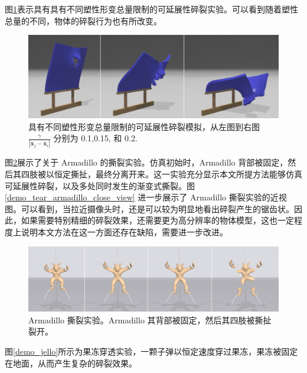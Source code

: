 图\ref{demo_impact_upside_plastic_fracture}表示具有具有不同塑性形变总量限制的可延展性碎裂实验。可以看到随着塑性总量的不同，物体的碎裂行为也有所改变。

\begin{figure}[!htb]
  \centering
  \captionsetup{justification=centering}
  \includegraphics[width=\linewidth]{chap/image/demo_impact_upside_plastic_fracture}

  \caption{\label{demo_impact_upside_plastic_fracture}
           具有不同塑性形变总量限制的可延展性碎裂模拟，从左图到右图 $\frac{\gamma}{|\mathbf{x}_j-\mathbf{x}_i|}$ 分别为 0.1,0.15, 和 0.2.
          }
\end{figure}

图\ref{demo_tear_armadillo}展示了关于 Armadillo 的撕裂实验。仿真初始时，Armadillo 背部被固定，然后其四肢被以恒定撕扯，最终分离开来。这一实验充分显示本文所提方法能够仿真可延展性碎裂，以及多处同时发生的渐变式撕裂。图\ref{demo_tear_armadillo_close_view} 进一步展示了 Armadillo 撕裂实验的近视图。可以看到，当拉近摄像头时，还是可以较为明显地看出碎裂产生的锯齿状。因此，如果需要特别精细的碎裂效果，还需要更为高分辨率的物体模型，这也一定程度上说明本文方法在这一方面还存在缺陷，需要进一步改进。

\begin{figure}[!htb]
  \centering
  \captionsetup{justification=centering}
  \includegraphics[width=\linewidth]{chap/image/demo_tear_armadillo}

  \caption{\label{demo_tear_armadillo}
           Armadillo 撕裂实验。Armadillo 其背部被固定，然后其四肢被撕扯裂开。
          }
\end{figure}

图\ref{demo_jello}所示为果冻穿透实验，一颗子弹以恒定速度穿过果冻，果冻被固定在地面，从而产生复杂的碎裂效果。

